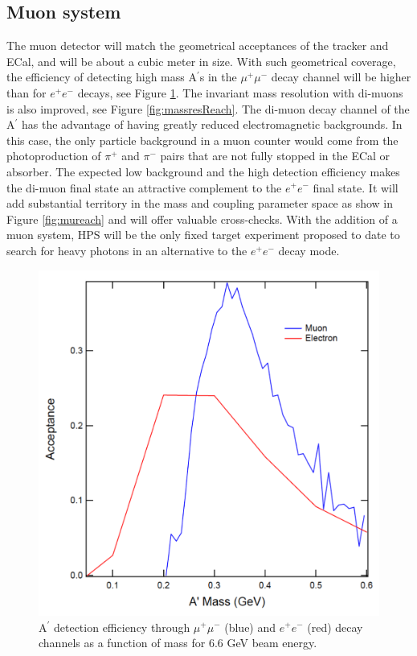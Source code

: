 \subsection{Muon system}

\label{sec:muon}


The muon detector will match the geometrical acceptances of the tracker and ECal, and will be about a cubic meter in size. With such 
geometrical coverage, the efficiency of detecting high mass A$^\prime$s in the $\mu^+\mu^-$ decay channel will be higher than for $e^+e^-$ 
decays, see Figure \ref{fig:muacc}. 
The invariant mass resolution with di-muons is also improved, see Figure \ref{fig:massresReach}. 
The di-muon decay channel of the A$^\prime$ has the advantage of having greatly reduced electromagnetic 
backgrounds.  In this case, the only particle background in a muon counter would come from the photoproduction of $\pi^+$ and $\pi^-$ pairs
that are not fully stopped in the ECal or absorber.  The expected low background and the high detection efficiency makes the di-muon final state an
attractive complement to the $e^+e^-$ final state. It will add substantial territory in the mass and coupling
parameter space as show in Figure \ref{fig:mureach} and will offer valuable cross-checks. With the addition of a muon system, HPS will be the 
only fixed target experiment proposed to date to search for heavy photons in an alternative to the $e^+e^-$ decay mode.

\begin{figure}[!ht]
\includegraphics[scale=0.4]{muon/acc.pdf}
\caption{\small{A$^\prime$ detection efficiency through $\mu^+\mu^-$ (blue) and $e^+e^-$ (red) decay channels as a function of mass for 6.6 
GeV beam energy.}}\label{fig:muacc}
\end{figure}

